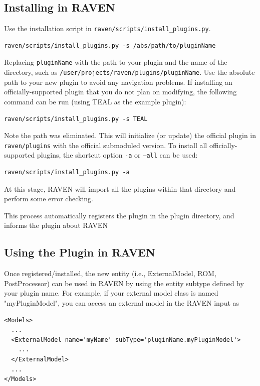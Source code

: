 \subsection{Installing in RAVEN}
Use the installation script in \texttt{raven/scripts/install\_plugins.py}.
\begin{lstlisting}[morekeywords={examplePlugin, pluginInstallation}]
  raven/scripts/install_plugins.py -s /abs/path/to/pluginName
\end{lstlisting}
Replacing \texttt{pluginName} with the path to your plugin and the name of the directory, such as
\texttt{/user/projects/raven/plugins/pluginName}.
Use the absolute path to your new plugin to avoid any navigation problems.
If installing an officially-supported plugin that you do not plan on modifying, the following command
can be run (using TEAL as the example plugin):
\begin{lstlisting}[morekeywords={examplePlugin, TEALInstallation}]
  raven/scripts/install_plugins.py -s TEAL
\end{lstlisting}
Note the path was eliminated. This will initialize (or update) the official plugin in
\texttt{raven/plugins} with the official submoduled version.
To install all officially-supported plugins, the shortcut option \texttt{-a} or \texttt{--all} can be used:
\begin{lstlisting}[morekeywords={examplePlugin, installAllPlugin}]
  raven/scripts/install_plugins.py -a
\end{lstlisting}
At this stage, RAVEN will import all the plugins within that directory and perform some error checking.

This process automatically registers the plugin in the plugin directory, and informs the plugin
about RAVEN %

\subsection{Using the Plugin in RAVEN}
Once registered/installed, the new entity (i.e., ExternalModel, ROM, PostProcessor) can be used in RAVEN by
using the entity subtype defined by your plugin name. For example, if your external model class is named "myPluginModel",
you can access an external model in the RAVEN input as

\begin{lstlisting}[morekeywords={usingPlugin}]
<Models>
  ...
  <ExternalModel name='myName' subType='pluginName.myPluginModel'>
    ...
  </ExternalModel>
  ...
</Models>
\end{lstlisting}


